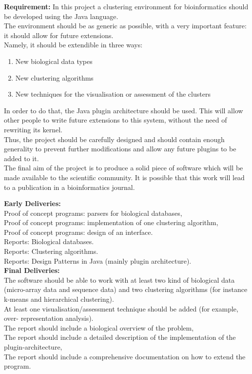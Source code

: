 \documentclass[]{final_report}
\begin{document}
 \textbf{Requirement: } 
In this project a clustering environment for bioinformatics should be developed using the Java language.\\
The environment should be as generic as possible, with a very important feature: it should allow for future extensions.\\
Namely, it should be extendible in three ways:
\begin{enumerate}
 \item New biological data types
 \item New clustering algorithms
 \item New techniques for the visualisation or assessment of the clusters
\end{enumerate}
In order to do that, the Java plugin architecture should be used. This will allow other people to write future extensions to this system, without the need of rewriting its kernel.\\
Thus, the project should be carefully designed and should contain enough generality to prevent further modifications and allow any future plugins to be added to it.\\
The final aim of the project is to produce a solid piece of software which will be made available to the scientific community. It is possible that this work will lead to a publication in a bioinformatics journal.

\textbf{Early Deliveries: } \\
Proof of concept programs: parsers for biological databases, \\
Proof of concept programs: implementation of one clustering algorithm,\\
Proof of concept programs: design of an interface.\\
Reports: Biological databases.\\
Reports: Clustering algorithms.\\
Reports: Design Patterns in Java (mainly plugin architecture).\\

\textbf{Final Deliveries: } \\
The software should be able to work with at least two kind of biological data (micro-array data and sequence data) and two clustering algorithms (for instance k-means and hierarchical clustering). \\
At least one visualisation/assessment technique should be added (for example, over- representation analysis).\\
The report should include a biological overview of the problem,\\
The report should include a detailed description of the implementation of the plugin-architecture, \\
The report should include a comprehensive documentation on how to extend the program.\\
\end{document}

